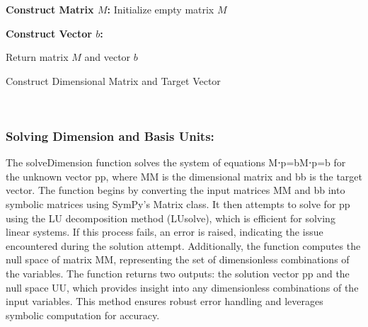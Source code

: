 \documentclass{article}
\begin{document}
\begin{algorithm}[H]
\SetAlgoLined
{}

\textbf{Construct Matrix \(M\):}\;
Initialize empty matrix \(M\)\;

\textbf{Construct Vector \(b\):}\;

Return matrix \(M\) and vector \(b\)\;

\caption{Construct Dimensional Matrix and Target Vector}
\label{alg:get_matrix_target} %
\end{algorithm}\\






\subsubsection{Solving Dimension and Basis Units:}



The solveDimension function solves the system of equations M⋅p=bM⋅p=b for the unknown vector pp, where MM is the dimensional matrix and bb is the target vector. The function begins by converting the input matrices MM and bb into symbolic matrices using SymPy's Matrix class. It then attempts to solve for pp using the LU decomposition method (LUsolve), which is efficient for solving linear systems. If this process fails, an error is raised, indicating the issue encountered during the solution attempt. Additionally, the function computes the null space of matrix MM, representing the set of dimensionless combinations of the variables. The function returns two outputs: the solution vector pp and the null space UU, which provides insight into any dimensionless combinations of the input variables. This method ensures robust error handling and leverages symbolic computation for accuracy.\\
\end{document}
